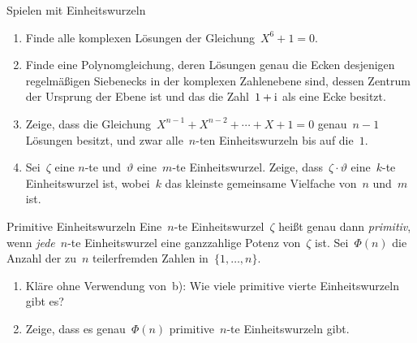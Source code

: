 \documentclass{algblatt}
\begin{document}
\begin{aufgabe}{Spielen mit Einheitswurzeln}
\begin{enumerate}
\item Finde alle komplexen Lösungen der Gleichung~$X^6 + 1 = 0$.
\item Finde eine Polynomgleichung, deren Lösungen genau die Ecken
desjenigen re\-gel\-mä\-ßi\-gen Siebenecks in der komplexen Zahlenebene sind, dessen Zentrum
der Ursprung der Ebene ist und das die Zahl~$1 + \mathrm{i}$ als eine Ecke besitzt.
\item Zeige, dass die Gleichung~$X^{n-1} + X^{n-2} + \cdots + X + 1 = 0$
genau~$n-1$ Lösungen besitzt, und zwar alle~$n$-ten Einheitswurzeln bis auf
die~$1$.
\item Sei~$\zeta$ eine $n$-te und~$\vartheta$ eine~$m$-te Einheitswurzel.
Zeige, dass~$\zeta \cdot \vartheta$ eine~$k$-te Einheitswurzel ist, wobei~$k$
das kleinste gemeinsame Vielfache von~$n$ und~$m$ ist.
\end{enumerate}
\end{aufgabe}

\begin{aufgabe}{Primitive Einheitswurzeln}
Eine~$n$-te Einheitswurzel~$\zeta$ heißt genau dann \emph{primitiv}, wenn
\emph{jede}~$n$-te Einheitswurzel eine ganzzahlige Potenz von~$\zeta$ ist.
Sei~$\Phi(n)$ die Anzahl der zu~$n$ teilerfremden Zahlen
in~$\{1,\ldots,n\}$.
\begin{enumerate}
\item Kläre ohne Verwendung von~b): Wie viele primitive vierte Einheitswurzeln gibt es?
\item Zeige, dass es genau~$\Phi(n)$ primitive~$n$-te
Einheitswurzeln gibt.
\end{enumerate}
\end{aufgabe}
\end{document}
